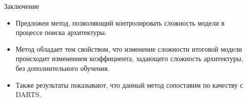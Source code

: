 \documentclass[aspectratio=169]{beamer}
\begin{document}
\begin{frame}{Заключение}
    \begin{itemize}
        \item Предложен метод, позволяющий контролировать сложность модели в процессе поиска архитектуры.
        \item Метод обладает тем свойством, что изменение сложности итоговой модели происходит изменением коэффициента, задающего сложность архитектуры,  без дополнительного обучения.
        \item Также результаты показывают, что данный метод сопоставим по качеству с DARTS.
    \end{itemize}
\end{frame}

\end{document}
